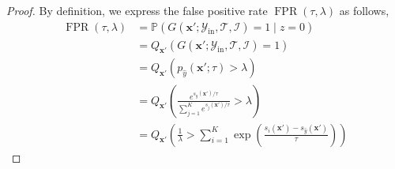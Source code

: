 \documentclass{article}
\def\*#1{\mathbf{#1}}
\begin{document}
\begin{proof}


By definition, we express the false positive rate $\operatorname{FPR}(\tau, \lambda)$ as follows,
\begin{equation*}
\begin{aligned}
\operatorname{FPR}(\tau, \lambda) &=  \mathbb{P}\left(G(\*x';\mathcal{Y}_\text{in},\mathcal{T},\mathcal{I}) =1 \mid z=0\right) \\
&= Q_{\*x'}\left(G(\*x';\mathcal{Y}_\text{in},\mathcal{T},\mathcal{I}) =1\right)\\
&= Q_{\*x'}\left(p_{\hat{y}}\left(\*x' ; \tau\right)>\lambda\right)\\
&=  Q_{\*x'}\left(\frac{e^{s_{\hat{y}}(\*x')/\tau}}{\sum_{j=1}^K e^{s_j(\*x')/\tau}}>\lambda\right)\\
&= Q_{\*x'}\left(\frac{1}{\lambda}>\sum_{i=1}^{K} \exp \left(\frac{s_i(\*x')-s_{\hat{y}}(\*x')}{\tau}\right)\right)
\end{aligned}
\end{equation*}


\end{proof}
\end{document}
